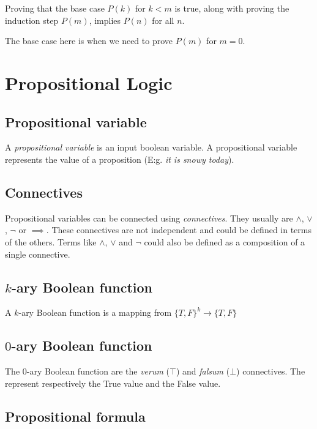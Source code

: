 \documentclass[a4paper]{article}
\begin{document}
Proving that the base case \(P(k)\) for \(k < m\) is true, along with
proving the induction step \(P(m)\), implies \(P(n)\)
for all \(n\).

The base case here is when we need to prove \(P(m)\) for \(m=0\).

\pagebreak

\section{Propositional Logic}

\subsection{Propositional variable}

A \textit{propositional variable} is an input boolean variable.
A propositional variable represents the value of a proposition (E:g. \textit{it is snowy today}).

\subsection{Connectives}

Propositional variables can be connected using \textit{connectives}.
They usually are \(\land\), \(\lor\), \(\lnot\) or \(\implies\).
These connectives are not independent and could be defined in terms of the others.
Terms like  \(\land\), \(\lor\) and \(\lnot\) could also be defined as a composition of a single connective.

\subsection{\(k\)-ary Boolean function}

A \(k\)-ary Boolean function is a mapping from \({\{T, F\}}^k \to \{T,F\}\)

\subsection{\(0\)-ary Boolean function}

The \(0\)-ary Boolean function are the \textit{verum} (\(\top\)) and \textit{falsum} (\(\bot\)) connectives.
The represent respectively the True value and the False value.

\subsection{Propositional formula}
\end{document}
